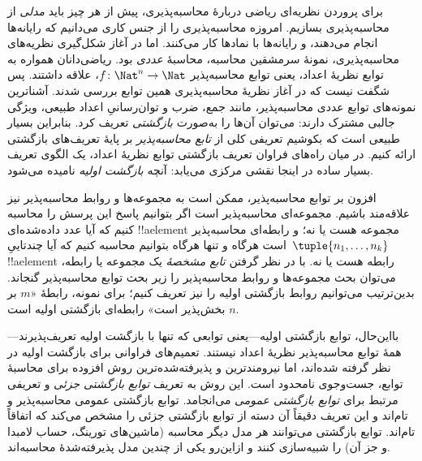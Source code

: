 \documentclass[../../../include/open-logic-section]{subfiles}
\begin{document}

برای پروردن نظریه‌ای ریاضی دربارهٔ محاسبه‌پذیری، پیش از هر چیز باید
\emph{مدلی} از محاسبه‌پذیری بسازیم. امروزه محاسبه‌پذیری را از جنس کاری
می‌دانیم که رایانه‌ها انجام می‌دهند، و رایانه‌ها با نمادها کار می‌کنند.
اما در آغاز شکل‌گیری نظریه‌های محاسبه‌پذیری، نمونهٔ سرمشقین محاسبه،
محاسبهٔ
\emph{عددی} بود. ریاضی‌دانان همواره به توابع نظریهٔ اعداد، یعنی توابع
محاسبه‌پذیر $f\colon \Nat^n \to \Nat$، علاقه داشتند. پس شگفت نیست
که در آغاز نظریهٔ محاسبه‌پذیری همین توابع بررسی شدند. آشناترین
نمونه‌های توابع عددی محاسبه‌پذیر، مانند جمع، ضرب و توان‌رسانیِ اعداد
طبیعی، ویژگی جالبی مشترک دارند: می‌توان آن‌ها را به‌صورت
\emph{بازگشتی} تعریف کرد. بنابراین بسیار طبیعی است که بکوشیم تعریفی
کلی از
\emph{تابع محاسبه‌پذیر} بر پایهٔ تعریف‌های بازگشتی ارائه کنیم. در
میان راه‌های فراوان تعریف بازگشتی توابع نظریهٔ اعداد، یک الگوی تعریف
بسیار ساده در اینجا نقشی مرکزی می‌یابد: آنچه
\emph{بازگشت اولیه} نامیده می‌شود.

افزون بر توابع محاسبه‌پذیر، ممکن است به مجموعه‌ها و روابط محاسبه‌پذیر
نیز علاقه‌مند باشیم. مجموعه‌ای محاسبه‌پذیر است اگر بتوانیم پاسخ این
پرسش را محاسبه کنیم که آیا عدد داده‌شده‌ای !!a{element} مجموعه هست یا
نه؛ و رابطه‌ای محاسبه‌پذیر است هرگاه و تنها هرگاه بتوانیم محاسبه کنیم
که آیا چندتاییِ~$\tuple{n_1, \dots, n_k}$ !!a{element} رابطه هست یا
نه. با در نظر گرفتن
\emph{تابع مشخصهٔ} یک مجموعه یا رابطه، می‌توان بحث مجموعه‌ها و روابط
محاسبه‌پذیر را زیر بحث توابع محاسبه‌پذیر گنجاند. بدین‌ترتیب می‌توانیم
روابط بازگشتی اولیه را نیز تعریف کنیم؛ برای نمونه، رابطهٔ «$m$ بر
$n$ بخش‌پذیر است» رابطه‌ای بازگشتی اولیه است.

بااین‌حال، توابع بازگشتی اولیه---یعنی توابعی که تنها با بازگشت اولیه
تعریف‌پذیرند---همهٔ توابع محاسبه‌پذیر نظریهٔ اعداد نیستند.
تعمیم‌های فراوانی برای بازگشت اولیه در نظر گرفته شده‌اند، اما
نیرومندترین و پذیرفته‌شده‌ترین روش افزوده برای محاسبهٔ توابع، جست‌وجوی
نامحدود است. این روش به تعریف
\emph{توابع بازگشتی جزئی} و تعریفی مرتبط برای
\emph{توابع بازگشتی عمومی} می‌انجامد. توابع بازگشتی عمومی محاسبه‌پذیر
و تام‌اند و این تعریف دقیقاً آن دسته از توابع بازگشتی جزئی را مشخص
می‌کند که اتفاقاً تام‌اند. توابع بازگشتی می‌توانند هر مدل دیگر محاسبه
(ماشین‌های تورینگ، حساب لامبدا و جز آن) را شبیه‌سازی کنند و ازاین‌رو
یکی از چندین مدل پذیرفته‌شدهٔ محاسبه‌اند.
\end{document}
